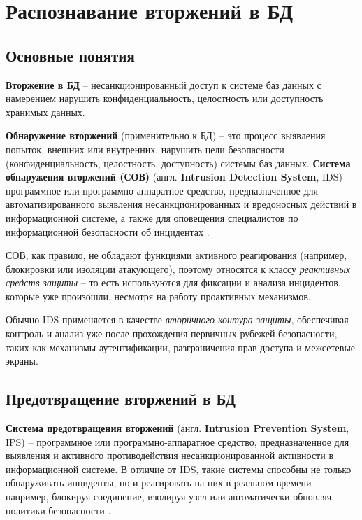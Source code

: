 \section{Распознавание вторжений в БД}

\subsection{Основные понятия}

\textbf{Вторжение в БД} -- несанкционированный доступ к системе баз данных с намерением нарушить конфиденциальность, целостность или доступность хранимых данных.\cite{bertino}

\textbf{Обнаружение вторжений} (применительно к БД) --  это процесс выявления попыток, внешних или внутренних, нарушить цели безопасности (конфиденциальность, целостность, доступность) системы баз данных. \cite{kamra}
\textbf{Система обнаружения вторжений (СОВ)} (англ. \textbf{Intrusion Detection System}, IDS) -- программное или программно-аппаратное средство, предназначенное для автоматизированного выявления несанкционированных и вредоносных действий в информационной системе, а также для оповещения специалистов по информационной безопасности об инцидентах \cite{kasperskyIDS}.

СОВ, как правило, не обладают функциями активного реагирования (например, блокировки или изоляции атакующего), поэтому относятся к классу \textit{реактивных средств защиты} -- то есть используются для фиксации и анализа инцидентов, которые уже произошли, несмотря на работу проактивных механизмов.

Обычно IDS применяется в качестве \textit{вторичного контура защиты}, обеспечивая контроль и анализ уже после прохождения первичных рубежей безопасности, таких как механизмы аутентификации, разграничения прав доступа и межсетевые экраны.

\subsection{Предотвращение вторжений в БД}

\textbf{Система предотвращения вторжений} (англ. \textbf{Intrusion Prevention System}, IPS) -- программное или программно-аппаратное средство, предназначенное для выявления и активного противодействия несанкционированной активности в информационной системе. В отличие от IDS, такие системы способны не только обнаруживать инциденты, но и реагировать на них в реальном времени -- например, блокируя соединение, изолируя узел или автоматически обновляя политики безопасности \cite{kasperskyIPS}.

